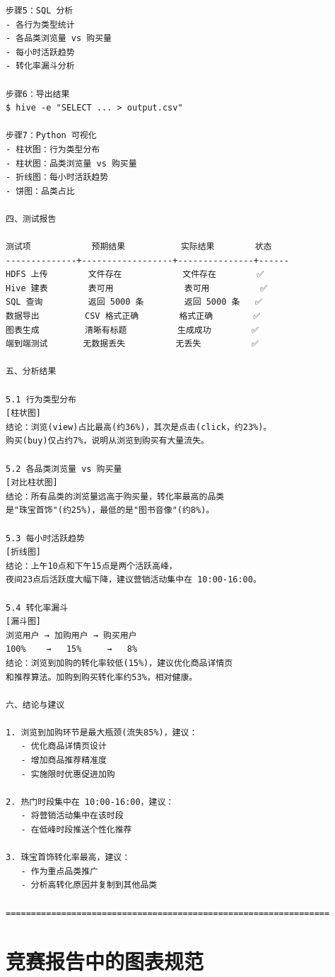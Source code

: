 \documentclass[12pt,a4paper]{article}
\begin{document}
\begin{knowledgebox}
{\begin{verbatim}
步骤5：SQL 分析
- 各行为类型统计
- 各品类浏览量 vs 购买量
- 每小时活跃趋势
- 转化率漏斗分析

步骤6：导出结果
$ hive -e "SELECT ... > output.csv"

步骤7：Python 可视化
- 柱状图：行为类型分布
- 柱状图：品类浏览量 vs 购买量
- 折线图：每小时活跃趋势
- 饼图：品类占比

四、测试报告

测试项            预期结果           实际结果        状态
--------------+------------------+---------------+------
HDFS 上传        文件存在            文件存在        ✅
Hive 建表        表可用              表可用          ✅
SQL 查询         返回 5000 条        返回 5000 条   ✅
数据导出         CSV 格式正确        格式正确        ✅
图表生成         清晰有标题          生成成功        ✅
端到端测试       无数据丢失          无丢失          ✅

五、分析结果

5.1 行为类型分布
[柱状图]
结论：浏览(view)占比最高(约36%)，其次是点击(click，约23%)。
购买(buy)仅占约7%，说明从浏览到购买有大量流失。

5.2 各品类浏览量 vs 购买量
[对比柱状图]
结论：所有品类的浏览量远高于购买量，转化率最高的品类
是"珠宝首饰"(约25%)，最低的是"图书音像"(约8%)。

5.3 每小时活跃趋势
[折线图]
结论：上午10点和下午15点是两个活跃高峰，
夜间23点后活跃度大幅下降，建议营销活动集中在 10:00-16:00。

5.4 转化率漏斗
[漏斗图]
浏览用户 → 加购用户 → 购买用户
100%    →   15%     →   8%
结论：浏览到加购的转化率较低(15%)，建议优化商品详情页
和推荐算法。加购到购买转化率约53%，相对健康。

六、结论与建议

1. 浏览到加购环节是最大瓶颈(流失85%)，建议：
   - 优化商品详情页设计
   - 增加商品推荐精准度
   - 实施限时优惠促进加购

2. 热门时段集中在 10:00-16:00，建议：
   - 将营销活动集中在该时段
   - 在低峰时段推送个性化推荐

3. 珠宝首饰转化率最高，建议：
   - 作为重点品类推广
   - 分析高转化原因并复制到其他品类

================================================================
\end{verbatim}
}
\end{knowledgebox}

\section{竞赛报告中的图表规范}
\end{document}
